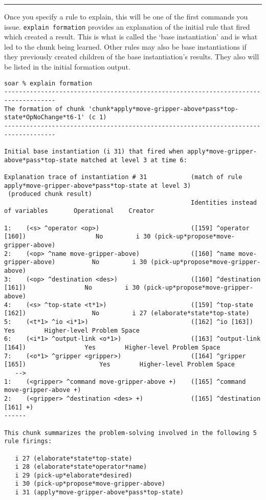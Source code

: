 \rule{\textwidth}{1pt}

\textbf{}

Once you specify a rule to explain, this will be one of the first commands you issue.  \texttt{explain\ formation} provides an explanation of the initial rule that fired which created a result. This is what is called the `base
instantiation' and is what led to the chunk being learned. Other rules may also be base instantiations if they previously created children of the base instantiation's results. They also will be listed in the initial formation output.

{\tiny
\begin{verbatim}
soar % explain formation
------------------------------------------------------------------------------------
The formation of chunk 'chunk*apply*move-gripper-above*pass*top-state*OpNoChange*t6-1' (c 1)
------------------------------------------------------------------------------------

Initial base instantiation (i 31) that fired when apply*move-gripper-above*pass*top-state matched at level 3 at time 6:

Explanation trace of instantiation # 31            (match of rule apply*move-gripper-above*pass*top-state at level 3)
 (produced chunk result)
                                                   Identities instead of variables       Operational    Creator

1:    (<s> ^operator <op>)                         ([159] ^operator [160])                   No         i 30 (pick-up*propose*move-gripper-above)
2:    (<op> ^name move-gripper-above)              ([160] ^name move-gripper-above)          No         i 30 (pick-up*propose*move-gripper-above)
3:    (<op> ^destination <des>)                    ([160] ^destination [161])                No         i 30 (pick-up*propose*move-gripper-above)
4:    (<s> ^top-state <t*1>)                       ([159] ^top-state [162])                  No         i 27 (elaborate*state*top-state)
5:    (<t*1> ^io <i*1>)                            ([162] ^io [163])                         Yes        Higher-level Problem Space
6:    (<i*1> ^output-link <o*1>)                   ([163] ^output-link [164])                Yes        Higher-level Problem Space
7:    (<o*1> ^gripper <gripper>)                   ([164] ^gripper [165])                    Yes        Higher-level Problem Space
   -->
1:    (<gripper> ^command move-gripper-above +)    ([165] ^command move-gripper-above +)
2:    (<gripper> ^destination <des> +)             ([165] ^destination [161] +)
------

This chunk summarizes the problem-solving involved in the following 5
rule firings:

   i 27 (elaborate*state*top-state)
   i 28 (elaborate*state*operator*name)
   i 29 (pick-up*elaborate*desired)
   i 30 (pick-up*propose*move-gripper-above)
   i 31 (apply*move-gripper-above*pass*top-state)
\end{verbatim}
}

